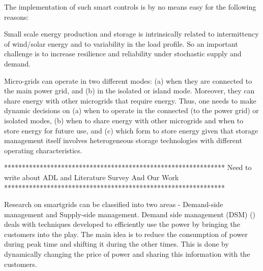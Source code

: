The implementation of such smart controls is by no means easy for the following reasons:
\begin{inparaenum}[\bfseries (i)]
\item Small scale energy production and storage is intrinsically
         related to intermittency of wind/solar energy and to variability in the load profile.
          So an important challenge is to increase resilience and reliability under stochastic supply and
                 demand.
\item Micro-grids can operate in two different modes: (a) when they are connected to the
main power grid, and (b) in the isolated or island mode. Moreover, they can share energy with
other microgrids that require energy. Thus, one needs to make
dynamic decisions on (a) when to operate in the connected (to the power grid) or isolated modes, 
(b) when to share energy with other microgrids and when to store energy for future use, and (c) 
which form to store energy given that storage management itself
involves heterogeneous storage technologies with different
operating characteristics.
\end{inparaenum}

**************************************************************
Need to write about ADL and Literature Survey And Our Work
**************************************************************


Research on smartgrids can be classified into two areas -  Demand-side management and Supply-side management. Demand side management (DSM) (\cite{logenthiran2011multi, wang2010demand,dsm1,dsm2,dsm3,dsm4}) deals with techniques developed to efficiently use the power by bringing the customers into the play. The main idea is to reduce the consumption of power during peak time and shifting it during the other times. This is done by dynamically changing the price of power and sharing this information with the customers. 

